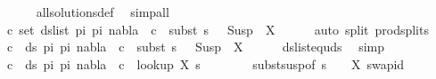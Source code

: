 \begin{isabellebody}
\ \ \ \ \isamarkupfalse%
\ all{\isacharunderscore}{\kern0pt}solutions{\isacharunderscore}{\kern0pt}def\ \isamarkupfalse%
\ simp{\isacharunderscore}{\kern0pt}all\isanewline
\ \ \isamarkupfalse%
\ {\isachardoublequoteopen}{\isasymforall}c{\isasymin}\ set\ {\isacharparenleft}{\kern0pt}ds{\isacharunderscore}{\kern0pt}list\ pi{}\ pi{}{\isacharparenright}{\kern0pt}{\isachardot}{\kern0pt}\ nabla{}\ {\isasymturnstile}\ c\ {\isasymsharp}\ subst\ {\isacharparenleft}{\kern0pt}s{}\ {\isasymbullet}\ {\isacharbrackleft}{\kern0pt}{\isacharbrackright}{\kern0pt}{\isacharparenright}{\kern0pt}\ {\isacharparenleft}{\kern0pt}Susp\ {\isacharbrackleft}{\kern0pt}{\isacharbrackright}{\kern0pt}\ X{\isacharparenright}{\kern0pt}{\isachardoublequoteclose}\isanewline
\ \ \ \ \isamarkupfalse%
\ {\isacharparenleft}{\kern0pt}auto\ split{\isacharcolon}{\kern0pt}\ prod{\isachardot}{\kern0pt}splits{\isacharparenright}{\kern0pt}\isanewline
\ \ \isamarkupfalse%
\ {\isachardoublequoteopen}{\isasymforall}c\ {\isasymin}\ ds\ pi{}\ pi{}{\isachardot}{\kern0pt}\ nabla{}\ {\isasymturnstile}\ c\ {\isasymsharp}\ subst\ {\isacharparenleft}{\kern0pt}s{}\ {\isasymbullet}\ {\isacharbrackleft}{\kern0pt}{\isacharbrackright}{\kern0pt}{\isacharparenright}{\kern0pt}\ {\isacharparenleft}{\kern0pt}Susp\ {\isacharbrackleft}{\kern0pt}{\isacharbrackright}{\kern0pt}\ X{\isacharparenright}{\kern0pt}{\isachardoublequoteclose}\isanewline
\ \ \ \ \isamarkupfalse%
\ ds{\isacharunderscore}{\kern0pt}list{\isacharunderscore}{\kern0pt}equ{\isacharunderscore}{\kern0pt}ds\ \isamarkupfalse%
\ simp\isanewline
\ \ \isamarkupfalse%
\ {\isachardoublequoteopen}{\isasymforall}c\ {\isasymin}\ ds\ pi{}\ pi{}{\isachardot}{\kern0pt}\ nabla{}\ {\isasymturnstile}\ c\ {\isasymsharp}\ {\isacharparenleft}{\kern0pt}look{\isacharunderscore}{\kern0pt}up\ X\ {\isacharparenleft}{\kern0pt}s{}\ {\isasymbullet}\ {\isacharbrackleft}{\kern0pt}{\isacharbrackright}{\kern0pt}{\isacharparenright}{\kern0pt}{\isacharparenright}{\kern0pt}{\isachardoublequoteclose}\isanewline
\ \ \ \ \isamarkupfalse%
\ subst{\isacharunderscore}{\kern0pt}susp{\isacharbrackleft}{\kern0pt}of\ {\isacartoucheopen}{\isacharparenleft}{\kern0pt}s{}\ {\isasymbullet}\ {\isacharbrackleft}{\kern0pt}{\isacharbrackright}{\kern0pt}{\isacharparenright}{\kern0pt}{\isacartoucheclose}\ {\isacartoucheopen}{\isacharbrackleft}{\kern0pt}{\isacharbrackright}{\kern0pt}{\isacartoucheclose}\ X{\isacharbrackright}{\kern0pt}\ swap{\isacharunderscore}{\kern0pt}id\ \isamarkupfalse%

\end{isabellebody}
